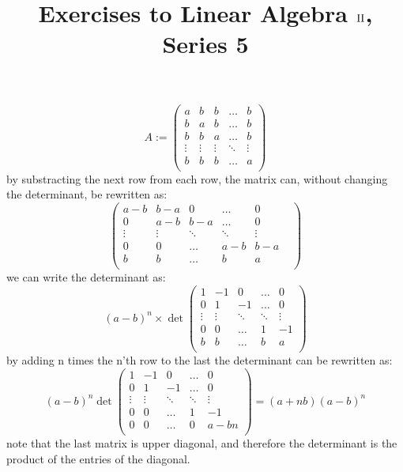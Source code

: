 \documentclass[a4paper,10pt]{article}
\title{Exercises to Linear Algebra $\RN{2}$,\\
Series 5 }
\author{\MyDetails}
\begin{document}
\maketitle
\setcounter{section}{5}
\subsection{}
\label{sub:one}
\begin{equation*}
	A:= \begin{pmatrix}
		a&b&b&\dots&b\\
		b&a&b&\dots&b\\
		b&b&a&\dots&b\\
		\vdots&\vdots&\vdots&\ddots&\vdots\\
		b&b&b&\dots&a\\
	\end{pmatrix}
\end{equation*}
by substracting the next row from each row, the matrix can, without changing the determinant, be rewritten as:
\begin{equation*}
	\begin{pmatrix}
		a-b&b-a&0&\dots&0\\
		0&a-b&b-a&\dots&0\\
		\vdots&\vdots&\ddots&\ddots&\vdots\\
		0&0&\dots&a-b&b-a&\\
		b&b&\dots&b&a\\
	\end{pmatrix}
\end{equation*}
we can write the determinant as:
\begin{equation*}
	(a-b)^n\times \det \begin{pmatrix}
		1&-1&0&\dots&0\\
		0&1&-1&\dots&0\\
		\vdots&\vdots&\ddots&\ddots&\vdots\\
		0&0&\dots&1&-1\\
		b&b&\dots&b&a\\
	\end{pmatrix}
\end{equation*}
by adding n times the n'th row to the last the determinant can be rewritten as:
\begin{equation*}
	(a-b)^n \det \begin{pmatrix}
		1&-1&0&\dots&0\\
		0&1&-1&\dots&0\\
		\vdots&\vdots&\ddots&\ddots&\vdots\\
		0&0&\dots&1&-1\\
		0&0&\dots&0&a-bn\\
	\end{pmatrix}=(a+nb)(a-b)^n
\end{equation*}
note that the last matrix is upper diagonal, and therefore the determinant is the product of the entries of the diagonal.
\end{document}
